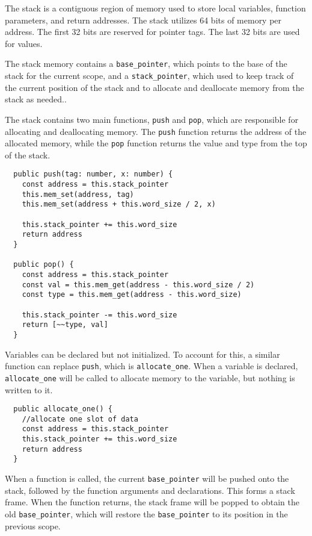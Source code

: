 \documentclass[a4paper]{article}
\begin{document}
The stack is a contiguous region of memory used to store local variables, function parameters, and return addresses. The stack utilizes 64 bits of memory per address. The first 32 bits are reserved for pointer tags. The last 32 bits are used for values.

The stack memory contains a \texttt{base\_pointer}, which points to the base of the stack for the current scope, and a \texttt{stack\_pointer}, which used to keep track of the current position of the stack and to allocate and deallocate memory from the stack as needed..

The stack contains two main functions, \texttt{push} and \texttt{pop}, which are responsible for allocating and deallocating memory. The \texttt{push} function returns the address of the allocated memory, while the \texttt{pop} function returns the value and type from the top of the stack.

\begin{verbatim}
  public push(tag: number, x: number) {
    const address = this.stack_pointer
    this.mem_set(address, tag)
    this.mem_set(address + this.word_size / 2, x)

    this.stack_pointer += this.word_size
    return address
  }

  public pop() {
    const address = this.stack_pointer
    const val = this.mem_get(address - this.word_size / 2)
    const type = this.mem_get(address - this.word_size)

    this.stack_pointer -= this.word_size
    return [~~type, val]
  }
\end{verbatim}

Variables can be declared but not initialized. To account for this, a similar function can replace \texttt{push}, which is \texttt{allocate\_one}. When a variable is declared, \texttt{allocate\_one} will be called to allocate memory to the variable, but nothing is written to it.

\begin{verbatim}
  public allocate_one() {
    //allocate one slot of data
    const address = this.stack_pointer
    this.stack_pointer += this.word_size
    return address
  }

  \end{verbatim}
  
 When a function is called, the current \texttt{base\_pointer} will be pushed onto the stack, followed by the function arguments and declarations. This forms a stack frame. When the function returns, the stack frame will be popped to obtain the old \texttt{base\_pointer}, which will restore the \texttt{base\_pointer} to its position in the previous scope. 
 
\end{document}
